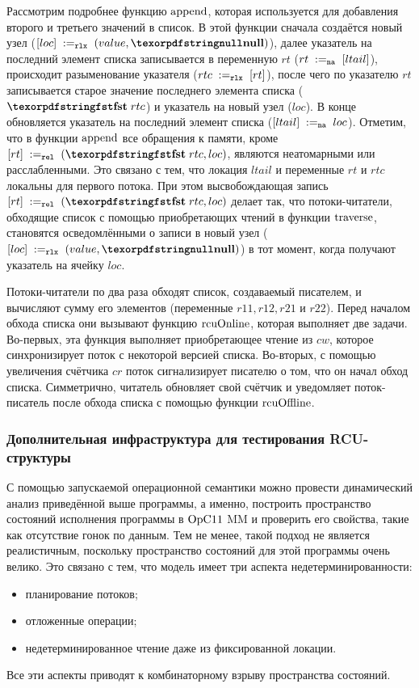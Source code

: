 Рассмотрим подробнее функцию ${\rm append}$, которая используется для добавления второго и третьего значений в список.
В этой функции сначала создаётся новый узел ($\writeInstParam{\rlx}{loc}{(value, \nullPtr)}$),
далее указатель на последний элемент списка записывается в переменную $rt$ ($rt \;:=_{\mathtt{na}}\;[ltail]$),
происходит разыменование указателя ($rtc \;:=_{\mathtt{rlx}}\;[rt]$),
после чего по указателю $rt$ записывается старое значение последнего элемента списка ($\kw{fst} \; rtc$)
и указатель на новый узел ($loc$).
В конце обновляется указатель на последний элемент списка ($[ltail] \;:=_{\mathtt{na}}\;loc$).
Отметим, что в функции ${\rm append}$ все обращения к памяти, кроме $\writeInstParam{\rel}{rt}{(\kw{fst} \; rtc, loc)}$,
являются неатомарными или расслабленными. Это связано с тем, что локация $ltail$ и переменные $rt$ и $rtc$ локальны
для первого потока. При этом высвобождающая запись $\writeInstParam{\rel}{rt}{(\kw{fst} \; rtc, loc)}$
делает так, что потоки-читатели, обходящие список с помощью приобретающих чтений в функции ${\rm traverse}$,
становятся осведомлёнными о записи в новый узел ($\writeInstParam{\rlx}{loc}{(value, \nullPtr)}$) в тот момент,
когда получают указатель на ячейку $loc$.

Потоки-читатели по два раза обходят список, создаваемый писателем, и вычисляют сумму его элементов
(переменные $r11, r12, r21$ и $r22$).
Перед началом обхода списка они вызывают функцию ${\rm rcuOnline}$,
которая выполняет две задачи. Во-первых, эта функция выполняет приобретающее чтение из $cw$, которое синхронизирует
поток с некоторой версией списка. Во-вторых, с помощью увеличения счётчика $cr$ поток сигнализирует писателю о том,
что он начал обход списка.
Симметрично, читатель обновляет свой счётчик и уведомляет поток-писатель после обхода списка с помощью функции ${\rm rcuOffline}$.

\subsubsection{Дополнительная инфраструктура для тестирования RCU-структуры}
С помощью запускаемой операционной семантики можно провести динамический анализ приведённой выше программы,
а именно, построить пространство состояний исполнения программы в $\mathrm{OpC11}$ MM и проверить его свойства,
такие как отсутствие гонок по данным.
Тем не менее, такой подход не является реалистичным, поскольку пространство состояний для этой программы очень велико.
Это связано с тем, что модель имеет три аспекта недетерминированности:
\begin{itemize}
  \item планирование потоков;
  \item отложенные операции;
  \item недетерминированное чтение даже из фиксированной локации.
\end{itemize}
Все эти аспекты приводят к комбинаторному взрыву пространства состояний.

